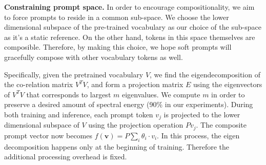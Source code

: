\documentclass[10pt,twocolumn,letterpaper]{article}
\begin{document}
\noindent \textbf{Constraining prompt space.} In order to encourage compositionality, we aim to force prompts to reside in a common sub-space. We choose the lower dimensional subspace of the pre-trained vocabulary as our choice of the sub-space as it's a static reference. On the other hand, tokens in this space themselves are composible. Therefore, by making this choice, we hope soft prompts will gracefully compose with other vocabulary tokens as well.

Specifically, given the pretrained vocabulary $V$, we find the eigendecomposition of the co-relation matrix $V^TV$, and form a projection matrix $E$ using the eigenvectors of $V^TV$ that corresponds to largest $m$ eigenvalues. We compute $m$ in order to preserve a desired amount of spectral energy (90\% in our experiments). 
During both training and inference, each prompt token $v_j$ is projected to the lower dimensional subspace of $V$ using the projection operation $Pv_j$. The composite prompt vector now becomes $f(\mathbf{v}) = P \sum_i \theta_i \cdot v_i$.
In this process, the eigen decomposition happens only at the beginning of training. Therefore the additional processing overhead is fixed.\\


 
\newcommand{\viewA}{${\text{viewA}}$\xspace}
\newcommand{\viewB}{${\text{viewB}}$\xspace}
\newcommand{\Y}{\mathcal{Y}}
\end{document}

